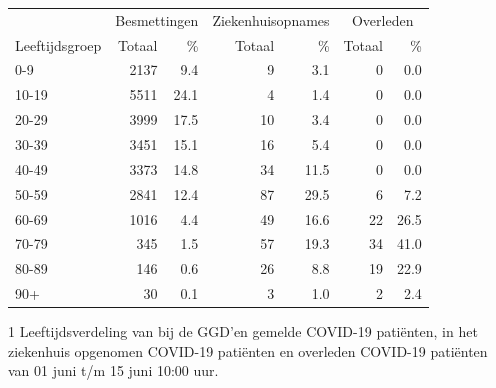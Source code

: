 \documentclass[
  english,
  man,floatsintext]{apa6}
\begin{document}
\begin{table}
\centering\begingroup\fontsize{11}{13}\selectfont

\begin{threeparttable}
\begin{tabular}{lrrrrrr}
\toprule
\multicolumn{1}{c}{ } & \multicolumn{2}{c}{Besmettingen} & \multicolumn{2}{c}{Ziekenhuisopnames} & \multicolumn{2}{c}{Overleden} \\
\cmidrule(l{3pt}r{3pt}){2-3} \cmidrule(l{3pt}r{3pt}){4-5} \cmidrule(l{3pt}r{3pt}){6-7}
Leeftijdsgroep & Totaal & \% & Totaal & \% & Totaal & \%\\
\midrule
0-9 & 2137 & 9.4 & 9 & 3.1 & 0 & 0.0\\
10-19 & 5511 & 24.1 & 4 & 1.4 & 0 & 0.0\\
20-29 & 3999 & 17.5 & 10 & 3.4 & 0 & 0.0\\
30-39 & 3451 & 15.1 & 16 & 5.4 & 0 & 0.0\\
40-49 & 3373 & 14.8 & 34 & 11.5 & 0 & 0.0\\
50-59 & 2841 & 12.4 & 87 & 29.5 & 6 & 7.2\\
60-69 & 1016 & 4.4 & 49 & 16.6 & 22 & 26.5\\
70-79 & 345 & 1.5 & 57 & 19.3 & 34 & 41.0\\
80-89 & 146 & 0.6 & 26 & 8.8 & 19 & 22.9\\
90+ & 30 & 0.1 & 3 & 1.0 & 2 & 2.4\\
\bottomrule
\end{tabular}
\begin{tablenotes}
\item[1] Leeftijdsverdeling van bij de GGD’en gemelde COVID-19 patiënten, in het ziekenhuis opgenomen COVID-19 patiënten en overleden COVID-19 patiënten van 01 juni t/m 15 juni 10:00 uur.
\end{tablenotes}
\end{threeparttable}
\endgroup{}
\end{table}

\newpage
\end{document}
